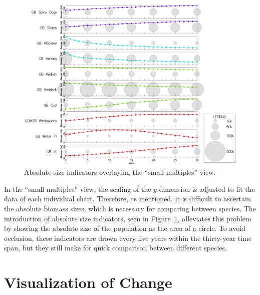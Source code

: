 \begin{figure}[h]
	\centering
	\includegraphics[width=12cm]{figures/eps/msprod_abssize.eps}
	\caption{Absolute size indicators overlaying the ``small multiples'' view.}
	\label{fig:msprod_abssize}
\end{figure}

In the ``small multiples'' view, the scaling of the $y$-dimension is adjusted to fit the data of each individual chart.  Therefore, as mentioned, it is difficult to ascertain the absolute biomass sizes, which is necessary for comparing between species.  The introduction of absolute size indicators, seen in Figure~\ref{fig:msprod_abssize}, alleviates this problem by showing the absolute size of the population as the area of a circle.  To avoid occlusion, these indicators are drawn every five years within the thirty-year time span, but they still make for quick comparison between different species.

\section{Visualization of Change}

